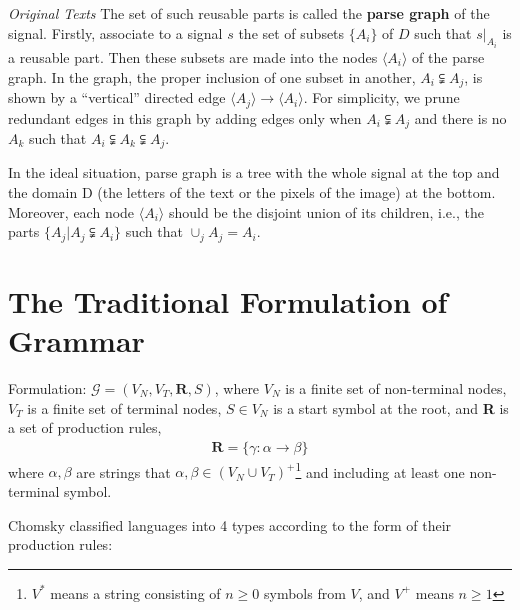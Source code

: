\documentclass[10pt,oneside]{book}
\newenvironment{book_quote}[1]
{%
  \mdfsetup{%
    frametitle={\colorbox{white}{\space#1\space}},
    frametitleaboveskip=-\ht\strutbox,
  }
  \begin{mdframed}
}
{
  \end{mdframed}
}
\begin{document}
\begin{book_quote}{\textit{Original Texts}}
  The set of such reusable parts is called the \textbf{parse graph} of the
  signal. Firstly, associate to a signal $s$ the set of subsets $\{A_i\}$ of
  $D$ such that $s\vert_{A_i}$ is a reusable part. Then these subsets are made
  into the nodes $\langle A_i \rangle$ of the parse graph. In the graph, the
  proper inclusion of one subset in another, $A_i \subsetneqq A_j$, is shown by
  a ``vertical'' directed edge
  $\langle A_j \rangle \rightarrow \langle A_i \rangle$. For simplicity, we
  prune redundant edges in this graph by adding edges only when
  $A_i \subsetneqq A_j$ and there is no $A_k$ such that
  $A_i \subsetneqq A_k \subsetneqq A_j$.

  \par
  In the ideal situation, parse graph is a tree with the whole signal at the
  top and the domain D (the letters of the text or the pixels of the image) at
  the bottom. Moreover, each node $\langle A_i \rangle$ should be the disjoint
  union of its children, i.e., the parts $\{A_j \vert A_j \subsetneqq A_i\}$
  such that $\cup_j A_j = A_i$.
\end{book_quote}

\section{The Traditional Formulation of Grammar}%
\label{sec:1.2}
Formulation: $\mathcal{G} = (V_N, V_T, \mathbf{R}, S)$, where $V_N$ is a finite
set of non-terminal nodes, $V_T$ is a finite set of terminal nodes, $S \in V_N$
is a start symbol at the root, and \textbf{R} is a set of production rules,
%
\begin{align}
  \label{eq:1.2}
  \mathbf{R} = \{\gamma: \alpha \rightarrow \beta\}
\end{align}
%
where $\alpha, \beta$ are strings that
$\alpha, \beta \in {(V_N \cup V_T)}^+$\footnote{$V^*$ means a string consisting
of $n \geq 0$ symbols from $V$, and $V^+$ means $n \geq 1$} and including at
least one non-terminal symbol.

Chomsky classified languages into 4 types according to the form of their
production rules:
\end{document}
